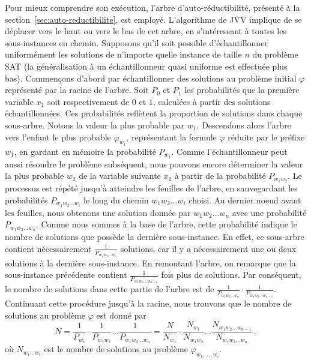 Pour mieux comprendre son exécution, l'arbre d'auto-réductibilité, présenté à la section~\ref{sec:auto-reductibilite}, est employé. L'algorithme de JVV implique de se déplacer vers le haut ou vers le bas de cet arbre, en s'intéressant à toutes les sous-instances en chemin. Supposons qu'il soit possible d'échantillonner uniformément les solutions de n'importe quelle instance de taille $n$ du problème SAT (la généralisation à un échantillonneur quasi uniforme est effectuée plus bas). Commençons d'abord par échantillonner des solutions au problème initial $\varphi$ représenté par la racine de l'arbre. Soit $P_{0}$ et $P_{1}$ les probabilités que la première variable $x_{1}$ soit respectivement de $0$ et $1$, calculées à partir des solutions échantillonnées. Ces probabilités reflètent la proportion de solutions dans chaque sous-arbre. Notons la valeur la plus probable par $w_{1}$. Descendons alors l'arbre vers l'enfant le plus probable $\varphi_{w_{1}}$, représentant la formule $\varphi$ réduite par le préfixe $w_{1}$, en gardant en mémoire la probabilité $P_{w_{1}}$. Comme l'échantillonneur peut aussi résoudre le problème subséquent, nous pouvons encore déterminer la valeur la plus probable $w_{2}$ de la variable suivante $x_{2}$ à partir de la probabilité $P_{w_{1}w_{2}}$. Le processus est répété jusqu'à atteindre les feuilles de l'arbre, en sauvegardant les probabilités $P_{w_{1} w_{2} \dots w_{i}}$ le long du chemin $w_{1} w_{2} \dots w_{i}$ choisi. Au dernier noeud avant les feuilles, nous obtenons une solution donnée par $w_{1} w_{2} \dots w_{n}$ avec une probabilité $P_{w_{1} w_{2} \dots w_{n}}$. Comme nous sommes à la base de l'arbre, cette probabilité indique le nombre de solutions que possède la dernière sous-instance. En effet, ce sous-arbre contient nécessairement $\frac{1}{P_{w_{1} w_{2} \dots w_{n}}}$ solutions, car il y a nécessairement une ou deux solutions à la dernière sous-instance. En remontant l'arbre, on remarque que la sous-instance précédente contient $\frac{1}{P_{w_{1} w_{2} \dots w_{n-1}}}$ fois plus de solutions. Par conséquent, le nombre de solutions dans cette partie de l'arbre est de $\frac{1}{P_{w_{1} w_{2} \dots w_{n}}} \cdot \frac{1}{P_{w_{1} w_{2} \dots w_{n-1}}}$. Continuant cette procédure jusqu'à la racine, nous trouvons que le nombre de solutions au problème $\varphi$ est donné par 
\begin{equation}
    N = \frac{1}{P_{w_{1}}} \cdot \frac{1}{P_{w_{1} w_{2}}} \dots \frac{1}{P_{w_{1} w_{2} \dots w_{n}}} = \frac{N}{N_{w_{1}}} \cdot \frac{N_{w_{1}}}{N_{w_{1} w_{2}}} \dots \frac{N_{w_{1} w_{2} \dots w_{n-1}}}{N_{w_{1} w_{2} \dots w_{n}}} \,,
\end{equation}
où $N_{w_{1} \dots w_{i}}$ est le nombre de solutions au problème $\varphi_{w_{1}, \dots, w_{i}}$.

